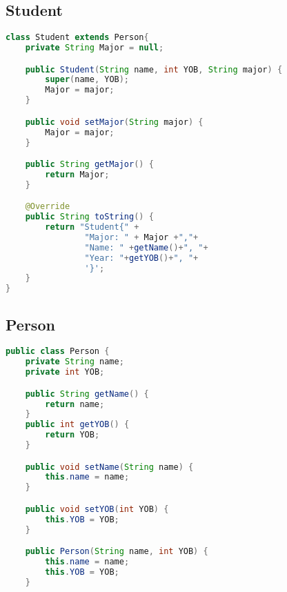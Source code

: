 \documentclass{article}
\begin{document}
\subsection*{Student}
\begin{lstlisting}[language=Java]
class Student extends Person{
    private String Major = null;

    public Student(String name, int YOB, String major) {
        super(name, YOB);
        Major = major;
    }

    public void setMajor(String major) {
        Major = major;
    }

    public String getMajor() {
        return Major;
    }

    @Override
    public String toString() {
        return "Student{" +
                "Major: " + Major +","+
                "Name: " +getName()+", "+
                "Year: "+getYOB()+", "+
                '}';
    }
}

\end{lstlisting}
\subsection*{Person}
\begin{lstlisting}[language=Java]
public class Person {
    private String name;
    private int YOB;

    public String getName() {
        return name;
    }
    public int getYOB() {
        return YOB;
    }

    public void setName(String name) {
        this.name = name;
    }

    public void setYOB(int YOB) {
        this.YOB = YOB;
    }

    public Person(String name, int YOB) {
        this.name = name;
        this.YOB = YOB;
    }\end{lstlisting}
\end{document}
